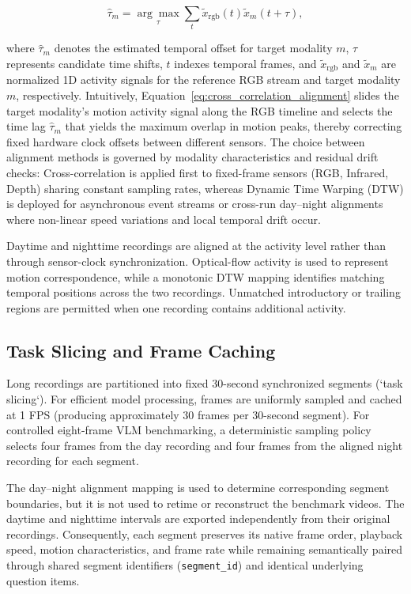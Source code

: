 \begin{equation}
    \hat{\tau}_m =
    \underset{\tau}{\arg\max}
    \sum_t
    \tilde{x}_{\mathrm{rgb}}(t)
    \tilde{x}_m(t+\tau),
    \label{eq:cross_correlation_alignment}
\end{equation}

where $\hat{\tau}_m$ denotes the estimated temporal offset for target modality $m$, $\tau$ represents candidate time shifts, $t$ indexes temporal frames, and $\tilde{x}_{\mathrm{rgb}}$ and $\tilde{x}_m$ are normalized 1D activity signals for the reference RGB stream and target modality $m$, respectively. Intuitively, Equation~\ref{eq:cross_correlation_alignment} slides the target modality's motion activity signal along the RGB timeline and selects the time lag $\hat{\tau}_m$ that yields the maximum overlap in motion peaks, thereby correcting fixed hardware clock offsets between different sensors. The choice between alignment methods is governed by modality characteristics and residual drift checks: Cross-correlation is applied first to fixed-frame sensors (RGB, Infrared, Depth) sharing constant sampling rates, whereas Dynamic Time Warping (DTW) is deployed for asynchronous event streams or cross-run day--night alignments where non-linear speed variations and local temporal drift occur.

Daytime and nighttime recordings are aligned at the activity level rather than
through sensor-clock synchronization. Optical-flow activity is used to represent
motion correspondence, while a monotonic DTW mapping identifies matching
temporal positions across the two recordings. Unmatched introductory or trailing
regions are permitted when one recording contains additional activity.

\subsection{Task Slicing and Frame Caching}

Long recordings are partitioned into fixed 30-second synchronized segments (`task slicing`).
For efficient model processing, frames are uniformly sampled and cached at 1 FPS (producing approximately
30 frames per 30-second segment). For controlled eight-frame VLM benchmarking, a deterministic
sampling policy selects four frames from the day recording and four frames from the aligned night
recording for each segment.

The day--night alignment mapping is used to determine corresponding segment
boundaries, but it is not used to retime or reconstruct the benchmark videos.
The daytime and nighttime intervals are exported independently from their
original recordings. Consequently, each segment preserves its native frame
order, playback speed, motion characteristics, and frame rate while remaining
semantically paired through shared segment identifiers (\texttt{segment\_id}) and identical
underlying question items.

